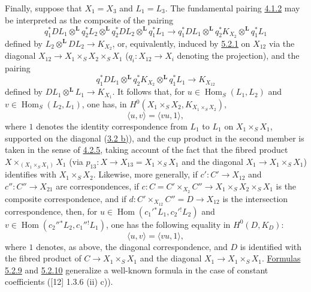 \documentclass[11pt]{article}
\DeclareMathOperator{\Hom}{Hom}
\providecommand{\Hom}{\operatorname{Hom}}
\providecommand{\Hom}{\operatorname{Hom}}
\begin{document}
Finally, suppose that $X_1=X_3$ and $L_1=L_3$. The fundamental pairing \hyperref[sga5:III:equation:4.1.2]{4.1.2} may be interpreted as the composite of the pairing
\begin{equation}
\tag{5.2.7}\label{sga5:III:equation:5.2.7}
q_1^*DL_1\otimes^{\mathbf L}q_2^*L_2\otimes^{\mathbf L}q_2^*DL_2\otimes^{\mathbf L}q_1^*L_1
\longrightarrow
q_1^*DL_1\otimes^{\mathbf L}q_2^*K_{X_2}\otimes^{\mathbf L}q_1^*L_1
\end{equation}
defined by $L_2\otimes^{\mathbf L}DL_2\to K_{X_2}$, or, equivalently, induced by \hyperref[sga5:III:equation:5.2.1]{5.2.1} on $X_{12}$ via the diagonal $X_{12}\to X_1\times_SX_2\times_SX_1$ ($q_i:X_{12}\to X_i$ denoting the projection), and the pairing
\begin{equation}
\tag{5.2.8}\label{sga5:III:equation:5.2.8}
q_1^*DL_1\otimes^{\mathbf L}q_2^*K_{X_2}\otimes^{\mathbf L}q_1^*L_1\longrightarrow K_{X_{12}}
\end{equation}
defined by $DL_1\otimes^{\mathbf L}L_1\to K_{X_1}$. It follows that, for $u\in\Hom_S(L_1,L_2)$ and $v\in\Hom_S(L_2,L_1)$, one has, in $H^0(X_1\times_SX_2,K_{X_1\times_SX_2})$,
\begin{equation}
\tag{5.2.9}\label{sga5:III:equation:5.2.9}
\langle u,v\rangle=\langle vu,1\rangle,
\end{equation}
where $1$ denotes the identity correspondence from $L_1$ to $L_1$ on $X_1\times_SX_1$, supported on the diagonal (\hyperref[sga5:III:subsection:3.2]{3.2 b)}), and the cup product in the second member is taken in the sense of \hyperref[sga5:III:equation:4.2.5]{4.2.5}, taking account of the fact that the fibred product $X\times_{(X_1\times_SX_1)}X_1$ (via $p_{13}:X\to X_{13}=X_1\times_SX_1$ and the diagonal $X_1\to X_1\times_SX_1$) identifies with $X_1\times_SX_2$. Likewise, more generally, if $c':C'\to X_{12}$ and $c'':C''\to X_{21}$ are correspondences, if $c:C=C'\times_{X_2}C''\to X_1\times_SX_2\times_SX_1$ is the composite correspondence, and if $d:C'\times_{X_{12}}C''=D\to X_{12}$ is the intersection correspondence, then, for $u\in\Hom(c_1'{}^*L_1,c_2'{}^!L_2)$ and $v\in\Hom(c_2''{}^*L_2,c_1''{}^!L_1)$, one has the following equality in $H^0(D,K_D)$:
\begin{equation}
\tag{5.2.10}\label{sga5:III:equation:5.2.10}
\langle u,v\rangle=\langle vu,1\rangle,
\end{equation}
where $1$ denotes, as above, the diagonal correspondence, and $D$ is identified with the fibred product of $C\to X_1\times_SX_1$ and the diagonal $X_1\to X_1\times_SX_1$. \hyperref[sga5:III:equation:5.2.9]{Formulas 5.2.9} and \hyperref[sga5:III:equation:5.2.10]{5.2.10} generalize a well-known formula in the case of constant coefficients ([12] 1.3.6 (ii) c)).
\end{document}
